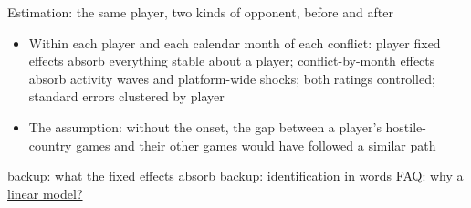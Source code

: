 \documentclass[aspectratio=169,11pt,t]{beamer}
\newcommand{\bk}[2]{\hyperlink{#1}{\textcolor{linkblue}{\scriptsize\textsf{backup: #2}}}}
\newcommand{\fq}[2]{\hyperlink{#1}{\textcolor{linkblue}{\scriptsize\textsf{FAQ: #2}}}}
\newcommand{\links}[1]{\vfill\hfill{#1}}
\begin{document}
\begin{frame}[label=comparison]{Estimation: the same player, two kinds of opponent, before and after}
  \centering
  \vspace{2mm}
  \begin{flushleft}\small
    \begin{itemize}
      \item Within each player and each calendar month of each conflict: player fixed effects absorb everything stable about a player; conflict-by-month effects absorb activity waves and platform-wide shocks; both ratings controlled; standard errors clustered by player
      \item The assumption: without the onset, the gap between a player's hostile-country games and their other games would have followed a similar path
    \end{itemize}
  \end{flushleft}
  \links{\bk{bk-fe}{what the fixed effects absorb} \quad \bk{bk-ident}{identification in words} \quad \fq{faq-lpm}{why a linear model?}}
\end{frame}
\end{document}
